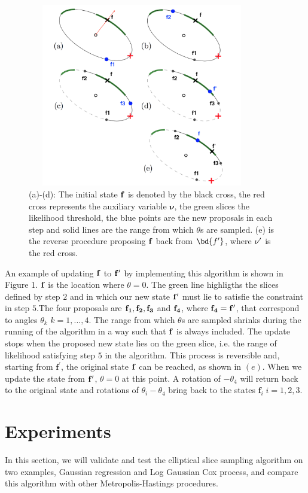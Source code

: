 \documentclass{article}
\begin{document}
\begin{figure}
    \centering
    \includegraphics[width = 10cm,height = 8cm]{essfig.png}
    \caption{(a)-(d): The initial state $\bf{f}$ is denoted by the black cross, the red cross represents the auxiliary variable $\pmb{\nu}$, the green slices the likelihood threshold, the blue points are the new proposals in each step and solid lines are the range from which $\theta$s are sampled. (e) is the reverse procedure proposing $\bf{f}$ back from $\bd{f'}$, where $\bf{\nu'}$ is the red cross.}
\end{figure}

An example of updating $\bf{f}$ to $\bf{f'}$ by implementing this algorithm is shown in Figure 1. $\bf{f}$ is the location where $\theta = 0$. The green line highligths the slices defined by step $2$ and in which our new state $\bf{f'}$ must lie to satisfie the constraint in step $5$.The four proposals are $\bf{f_1}, \bf{f_2}, \bf{f_3}$ and $\bf{f_4}$, where $\bf{f_4} = \bf{f'}$, that correspond to angles $\theta_k$ $k=1,...,4$. The range from which $\theta$s are sampled shrinks during the running of the algorithm in a way such that $\bf{f}$ is always included. The update stops when the proposed new state lies on the green slice, i.e. the range of likelihood satisfying step $5$ in the algorithm. This process is reversible and, starting from $\mathbf{f^'}$, the original state $\bf{f}$ can be reached, as shown in $(e)$. When we update the state from $\bf{f'}$, $\theta = 0$ at this point. A rotation of $-\theta_4$ will return back to the original state and rotations of $\theta_i-\theta_4$ bring back to the states $\mathbf{f}_i\;i=1,2,3$.


\section{Experiments}
In this section, we will validate and test the elliptical slice sampling algorithm on two examples, Gaussian regression and Log Gaussian Cox process, and compare this algorithm with other Metropolis-Hastings procedures.
\end{document}
